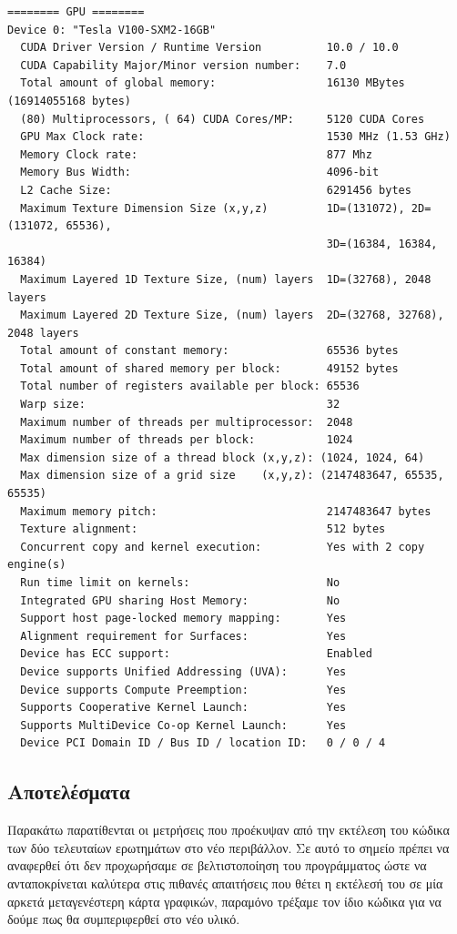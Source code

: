 \begin{verbatim}
======== GPU ========
Device 0: "Tesla V100-SXM2-16GB"
  CUDA Driver Version / Runtime Version          10.0 / 10.0
  CUDA Capability Major/Minor version number:    7.0
  Total amount of global memory:                 16130 MBytes (16914055168 bytes)
  (80) Multiprocessors, ( 64) CUDA Cores/MP:     5120 CUDA Cores
  GPU Max Clock rate:                            1530 MHz (1.53 GHz)
  Memory Clock rate:                             877 Mhz
  Memory Bus Width:                              4096-bit
  L2 Cache Size:                                 6291456 bytes
  Maximum Texture Dimension Size (x,y,z)         1D=(131072), 2D=(131072, 65536), 
                                                 3D=(16384, 16384, 16384)
  Maximum Layered 1D Texture Size, (num) layers  1D=(32768), 2048 layers
  Maximum Layered 2D Texture Size, (num) layers  2D=(32768, 32768), 2048 layers
  Total amount of constant memory:               65536 bytes
  Total amount of shared memory per block:       49152 bytes
  Total number of registers available per block: 65536
  Warp size:                                     32
  Maximum number of threads per multiprocessor:  2048
  Maximum number of threads per block:           1024
  Max dimension size of a thread block (x,y,z): (1024, 1024, 64)
  Max dimension size of a grid size    (x,y,z): (2147483647, 65535, 65535)
  Maximum memory pitch:                          2147483647 bytes
  Texture alignment:                             512 bytes
  Concurrent copy and kernel execution:          Yes with 2 copy engine(s)
  Run time limit on kernels:                     No
  Integrated GPU sharing Host Memory:            No
  Support host page-locked memory mapping:       Yes
  Alignment requirement for Surfaces:            Yes
  Device has ECC support:                        Enabled
  Device supports Unified Addressing (UVA):      Yes
  Device supports Compute Preemption:            Yes
  Supports Cooperative Kernel Launch:            Yes
  Supports MultiDevice Co-op Kernel Launch:      Yes
  Device PCI Domain ID / Bus ID / location ID:   0 / 0 / 4
\end{verbatim}

\subsection*{Αποτελέσματα}

\noindent Παρακάτω παρατίθενται οι μετρήσεις που προέκυψαν από την εκτέλεση του κώδικα των δύο τελευταίων ερωτημάτων στο νέο περιβάλλον. Σε αυτό το σημείο πρέπει να αναφερθεί ότι δεν προχωρήσαμε σε βελτιστοποίηση του προγράμματος ώστε να ανταποκρίνεται καλύτερα στις πιθανές απαιτήσεις που θέτει η εκτέλεσή του σε μία αρκετά μεταγενέστερη κάρτα γραφικών, παραμόνο τρέξαμε τον ίδιο κώδικα για να δούμε πως θα συμπεριφερθεί στο νέο υλικό.

